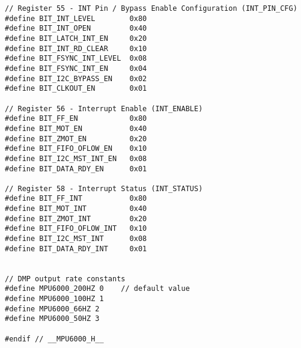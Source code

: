 \begin{lstlisting}[caption=MPU6000 Defines,label=Code3]
// Register 55 - INT Pin / Bypass Enable Configuration (INT_PIN_CFG)
#define BIT_INT_LEVEL        0x80
#define BIT_INT_OPEN         0x40
#define BIT_LATCH_INT_EN     0x20
#define BIT_INT_RD_CLEAR     0x10
#define BIT_FSYNC_INT_LEVEL  0x08
#define BIT_FSYNC_INT_EN     0x04
#define BIT_I2C_BYPASS_EN    0x02
#define BIT_CLKOUT_EN        0x01

// Register 56 - Interrupt Enable (INT_ENABLE)
#define BIT_FF_EN            0x80
#define BIT_MOT_EN           0x40
#define BIT_ZMOT_EN          0x20
#define BIT_FIFO_OFLOW_EN    0x10
#define BIT_I2C_MST_INT_EN   0x08
#define BIT_DATA_RDY_EN      0x01

// Register 58 - Interrupt Status (INT_STATUS)
#define BIT_FF_INT           0x80
#define BIT_MOT_INT          0x40
#define BIT_ZMOT_INT         0x20
#define BIT_FIFO_OFLOW_INT   0x10
#define BIT_I2C_MST_INT      0x08
#define BIT_DATA_RDY_INT     0x01


// DMP output rate constants
#define MPU6000_200HZ 0    // default value
#define MPU6000_100HZ 1
#define MPU6000_66HZ 2
#define MPU6000_50HZ 3

#endif // __MPU6000_H__

\end{lstlisting}
\pagebreak
